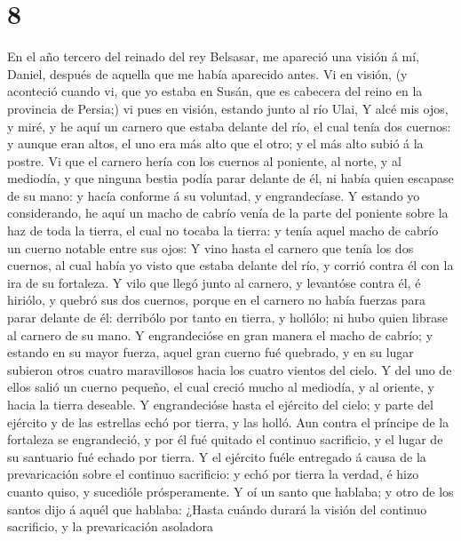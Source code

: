 \hypertarget{section-7}{%
\section{8}\label{section-7}}

 En el año tercero del reinado del rey Belsasar, me apareció
una visión á mí, Daniel, después de aquella que me había aparecido
antes.  Vi en visión, (y aconteció cuando vi, que yo estaba
en Susán, que es cabecera del reino en la provincia de Persia;) vi pues
en visión, estando junto al río Ulai,  Y alcé mis ojos, y
miré, y he aquí un carnero que estaba delante del río, el cual tenía dos
cuernos: y aunque eran altos, el uno era más alto que el otro; y el más
alto subió á la postre.  Vi que el carnero hería con los
cuernos al poniente, al norte, y al mediodía, y que ninguna bestia podía
parar delante de él, ni había quien escapase de su mano: y hacía
conforme á su voluntad, y engrandecíase.  Y estando yo
considerando, he aquí un macho de cabrío venía de la parte del poniente
sobre la haz de toda la tierra, el cual no tocaba la tierra: y tenía
aquel macho de cabrío un cuerno notable entre sus ojos:  Y
vino hasta el carnero que tenía los dos cuernos, al cual había yo visto
que estaba delante del río, y corrió contra él con la ira de su
fortaleza.  Y vilo que llegó junto al carnero, y levantóse
contra él, é hiriólo, y quebró sus dos cuernos, porque en el carnero no
había fuerzas para parar delante de él: derribólo por tanto en tierra, y
hollólo; ni hubo quien librase al carnero de su mano.  Y
engrandecióse en gran manera el macho de cabrío; y estando en su mayor
fuerza, aquel gran cuerno fué quebrado, y en su lugar subieron otros
cuatro maravillosos hacia los cuatro vientos del cielo.  Y
del uno de ellos salió un cuerno pequeño, el cual creció mucho al
mediodía, y al oriente, y hacia la tierra deseable.  Y
engrandecióse hasta el ejército del cielo; y parte del ejército y de las
estrellas echó por tierra, y las holló.  Aun contra el
príncipe de la fortaleza se engrandeció, y por él fué quitado el
continuo sacrificio, y el lugar de su santuario fué echado por tierra.
 Y el ejército fuéle entregado á causa de la prevaricación
sobre el continuo sacrificio: y echó por tierra la verdad, é hizo cuanto
quiso, y sucedióle prósperamente.  Y oí un santo que
hablaba; y otro de los santos dijo á aquél que hablaba: ¿Hasta cuándo
durará la visión del continuo sacrificio, y la prevaricación asoladora
